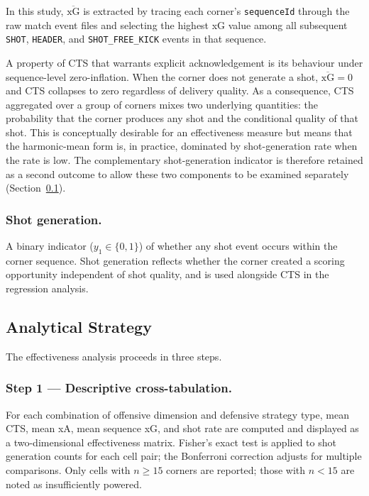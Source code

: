 In this study, $\overline{\mathrm{xG}}$ is extracted by tracing each corner's
\texttt{sequenceId} through the raw match event files and selecting the highest
xG value among all subsequent \texttt{SHOT}, \texttt{HEADER}, and
\texttt{SHOT\_FREE\_KICK} events in that sequence.

A property of CTS that warrants explicit acknowledgement is its behaviour
under sequence-level zero-inflation. When the corner does not generate a
shot, $\overline{\mathrm{xG}} = 0$ and CTS collapses to zero regardless of
delivery quality. As a consequence, CTS aggregated over a group of corners
mixes two underlying quantities: the probability that the corner produces
any shot and the conditional quality of that shot. This is conceptually
desirable for an effectiveness measure but means that the harmonic-mean
form is, in practice, dominated by shot-generation rate when the rate is
low. The complementary shot-generation indicator is therefore retained as a
second outcome to allow these two components to be examined separately
(Section~\ref{sec:sq3_analysis}).

\subsubsection{Shot generation.}
A binary indicator ($y_1 \in \{0,1\}$) of whether any shot event occurs within
the corner sequence. Shot generation reflects whether the corner created
a scoring opportunity independent of shot quality, and is used alongside CTS
in the regression analysis.

\subsection{Analytical Strategy}
\label{sec:sq3_analysis}

The effectiveness analysis proceeds in three steps.

\subsubsection{Step 1 — Descriptive cross-tabulation.}
For each combination of offensive dimension and defensive strategy type,
mean CTS, mean xA, mean sequence xG, and shot rate are computed and displayed
as a two-dimensional effectiveness matrix. Fisher's exact test is applied to shot
generation counts for each cell pair; the Bonferroni correction adjusts for
multiple comparisons. Only cells with $n \geq 15$ corners are reported; those
with $n < 15$ are noted as insufficiently powered.

